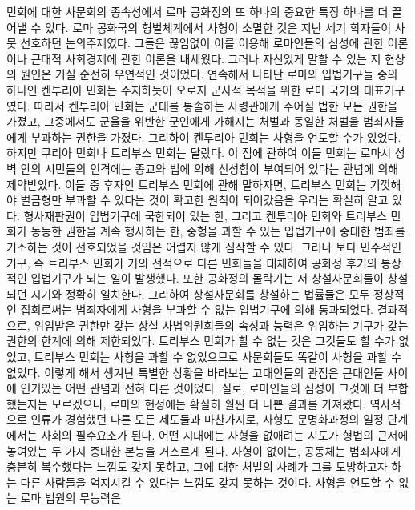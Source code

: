 민회에 대한 사문회의 종속성에서
로마 공화정의 또 하나의 중요한 특징 하나를 더
끌어낼 수 있다.
로마 공화국의 형벌체계에서 사형이 소멸한 것은
지난 세기 학자들이 사뭇 선호하던 논의주제였다.
그들은 끊임없이 이를 이용해
로마인들의 심성에 관한 이론이나
근대적 사회경제에 관한 이론을 내세웠다.
그러나 자신있게 말할 수 있는 저 현상의 원인은
기실 순전히 우연적인 것이었다.
연속해서 나타난 로마의 입법기구들 중의 하나인
켄투리아 민회는 주지하듯이
오로지 군사적 목적을 위한 로마 국가의 대표기구였다.
따라서 켄투리아 민회는
군대를 통솔하는 사령관에게 주어질 법한 모든 권한을 가졌고,
그중에서도
군율을 위반한 군인에게 가해지는 처벌과 동일한 처벌을 범죄자들에게
부과하는 권한을 가졌다.
그리하여 켄투리아 민회는 사형을 언도할 수가 있었다.
하지만 쿠리아 민회나
트리부스 민회는 달랐다.
이 점에 관하여 이들 민회는
로마시 성벽 안의 시민들의 인격에는
종교와 법에 의해
신성함이 부여되어 있다는 관념에 의해 제약받았다.
이들 중 후자인 트리부스 민회에 관해 말하자면,
트리부스 민회는 기껏해야 벌금형만 부과할 수 있다는 것이
확고한 원칙이 되어갔음을 우리는 확실히 알고 있다.
형사재판권이 입법기구에 국한되어 있는 한,
그리고 켄투리아 민회와 트리부스 민회가
동등한 권한을 계속 행사하는 한,
중형을 과할 수 있는 입법기구에
중대한 범죄를
기소하는 것이
선호되었을 것임은 어렵지 않게 짐작할 수 있다.
그러나
보다 민주적인 기구, 즉 트리부스 민회가
거의 전적으로 다른 민회들을 대체하여
공화정 후기의 통상적인 입법기구가 되는 일이 발생했다.
또한
공화정의 몰락기는
저 상설사문회들이 창설되던 시기와 정확히 일치한다.
그리하여
상설사문회를 창설하는 법률들은 모두
정상적인 집회로써는
범죄자에게 사형을 부과할 수 없는 입법기구에 의해 통과되었다.
결과적으로,
위임받은 권한만 갖는
상설 사법위원회들의
속성과 능력은
위임하는 기구가 갖는 권한의 한계에 의해 제한되었다.
트리부스 민회가 할 수 없는 것은
그것들도 할 수가 없었고,
트리부스 민회는 사형을 과할 수 없었으므로
사문회들도 똑같이 사형을 과할 수 없었다.
이렇게 해서 생겨난 특별한 상황을 바라보는
고대인들의 관점은
근대인들 사이에 인기있는 어떤 관념과 전혀 다른 것이었다.
실로,
로마인들의 심성이 그것에 더 부합했는지는 모르겠으나,
로마의 헌정에는 확실히 훨씬 더 나쁜 결과를 가져왔다.
역사적으로 인류가 경험했던 다른 모든 제도들과 마찬가지로,
사형도 문명화과정의 일정 단계에서는 사회의 필수요소가 된다.
어떤 시대에는
사형을 없애려는 시도가
형법의 근저에 놓여있는 두 가지 중대한 본능을 거스르게 된다.
사형이 없이는,
공동체는 범죄자에게 충분히 복수했다는 느낌도 갖지 못하고,
그에 대한 처벌의 사례가
그를 모방하고자 하는 다른 사람들을 억지시킬 수 있다는 느낌도
갖지 못하는 것이다.
사형을 언도할 수 없는 로마 법원의 무능력은
